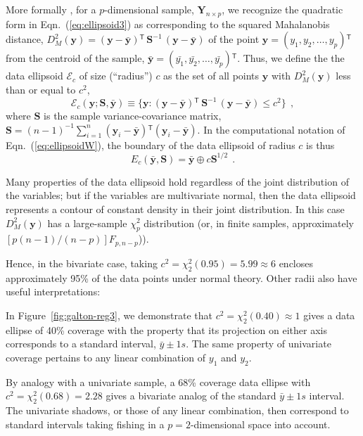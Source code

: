 \documentclass[11pt]{article}%
\newcommand*{\figref}[1]{Figure~\ref{#1}}
\renewcommand*{\eqref}[1]{Eqn.~(\ref{#1})}
\renewcommand*{\vec}[1]{\ensuremath{\bm{#1}}}
\newcommand{\trans}{\ensuremath{^\mathsf{T}}}
\newcommand*{\mat}[1]{\ensuremath{\bm{#1}}}
\newcommand*{\dev}[1]{(#1 - \bar{#1})}
\newcommand*{\inv}[1]{\ensuremath{\mat{#1}^{-1}}}
\newcommand*{\period}{\:\: .}
\newcommand*{\comma}{\:\: ,}
\begin{document}
More formally \citep{Dempster:69,Monette:90}, for a $p$-dimensional
sample, $\mat{Y}_{n \times p}$, 
we recognize the quadratic form in \eqref{eq:ellipsoid3}
as corresponding to the squared Mahalanobis distance,
$D^2_M (\vec{y}) = \dev{\vec{y}}\trans \, \inv{S} \, \dev{\vec{y}}$
of the point 
$\vec{y} = (y_1, y_2, \dots , y_p)\trans$ 
from the centroid of the sample,
$\bar{\vec{y}} = (\bar{y_1}, \bar{y_2}, \dots , \bar{y_p})\trans$.
Thus, we define the the data ellipsoid $\mathcal{E}_c$ of size (``radius'') $c$
as the set of all points $\vec{y}$ with $D^2_M (\vec{y})$ less than or
equal to $c^2$,
\begin{equation}\label{eq:dsq}
\mathcal{E}_c ( \vec{y}; \mat{S},  \bar{\vec{y}} ) 
\equiv \{ \vec{y} : 
\dev{\vec{y}}\trans \, \inv{S} \, \dev{\vec{y}} \le c^2 \} \comma
\end{equation}
where $\mat{S}$ is the sample variance-covariance matrix,
\(
\mat{S}
 = ({n-1})^{-1} \sum_{i=1}^n (\vec{y}_i - \bar{\vec{y}})\trans (\vec{y}_i - \bar{\vec{y}})
\).  In the computational notation of \eqref{eq:ellipsoidW}, the boundary of the
data ellipsoid of radius $c$ is thus
\begin{equation}\label{eq:ellipsoidS}
E_c(\bar{\vec{y}}, \mat{S}) = \bar{\vec{y}} \oplus c \mat{S}^{1/2} \period
\end{equation} 

Many properties of the data ellipsoid hold regardless of the joint distribution of the
variables; but if the variables are multivariate normal, then the data ellipsoid represents
a contour of constant density in their joint distribution.  In this case $D^2_M (\vec{y})$
has a large-sample $\chi^2_p$ distribution (or, in finite samples, approximately
$[p (n-1) / (n-p)] F_{p, n-p}$)).

Hence, in the bivariate case, taking $c^2 = \chi^2_2(0.95)= 5.99 \approx 6$ encloses approximately
95\% of the data points under normal theory.  Other radii also have useful interpretations:
\begin{itemize*}
\item In \figref{fig:galton-reg3}, we demonstrate that $c^2 = \chi^2_2(0.40) \approx 1$ gives
a data ellipse of 40\% coverage with the property that its projection on either axis
corresponds to a standard interval, $\bar{y} \pm 1 s$.  The same property of univariate
coverage pertains to
any linear combination of $y_1$ and $y_2$.
\item By analogy with a univariate sample, a 68\% coverage data ellipse with
$c^2 = \chi^2_2(0.68) = 2.28$ gives a bivariate analog of the standard $\bar{y} \pm 1 s$ interval.
The univariate shadows, or those of any linear combination, then correspond to standard
intervals taking fishing in a $p=2$-dimensional space into account.
\end{itemize*}
\end{document}
